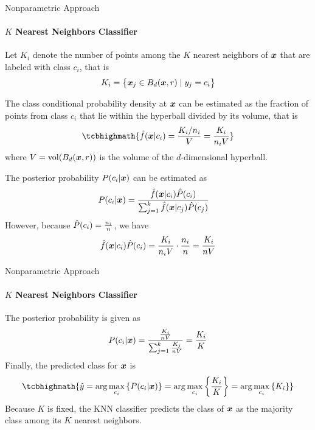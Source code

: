\begin{frame}{Nonparametric Approach}
\framesubtitle{$K$ Nearest Neighbors Classif\/{i}er}
Let $K_i$ denote the number of points among the $K$ nearest neighbors of
${\boldsymbol x}$ that are labeled with class $c_i$, that is
\begin{align*}
  K_i = \bigl\{{\boldsymbol x}_{j} \in B_d({\boldsymbol x},r) \mid y_{j} = c_i\bigr\}
\end{align*}

The class conditional probability density at ${\boldsymbol x}$ can be estimated as
the fraction of points from class $c_i$ that lie within the hyperball
divided by its volume, that is
\begin{align*}
\tcbhighmath{
  \hf(\bx|c_i) = \frac{K_i\text{/}n_i}{V}  = \frac{K_i}{n_i V}
}
\end{align*}
where $V = \vol(B_d(\bx,r))$ is the volume of the $d$-dimensional
hyperball.

The posterior probability $P(c_i|{\boldsymbol x})$
can be estimated as
\begin{align*}
    P(c_i|{\boldsymbol x}) &
    = \frac{\kern3pt\hat{\kern-3pt f}({\boldsymbol x}|c_i) \hat{P}(c_i)}{\sum_{j=1}^k \kern3pt\hat{\kern-3pt f}({\boldsymbol x}|c_{j}) \hat{P}(c_{j})}
\end{align*}
However, because $\hat{P}(c_i) = \tfrac{n_i}{n}$, we have
\begin{align*}
  \kern3pt\hat{\kern-3pt f}({\boldsymbol x}|c_i) \hat{P}(c_i) = \frac{K_i}{n_i V} \cdot \frac{n_i}{n} =
  \frac{K_i}{nV}
\end{align*}
\end{frame}


\begin{frame}{Nonparametric Approach}
\framesubtitle{$K$ Nearest Neighbors Classif\/{i}er}
The posterior probability is given as
\begin{align*}
  P(c_i|{\boldsymbol x}) =
  \frac{\frac{K_i}{n V}}{\sum_{j=1}^k \frac{K_{j}}{n V}}
  = \frac{K_i}{K}
\end{align*}
F{i}nally, the predicted class for ${\boldsymbol x}$ is
\begin{align*}
\tcbhighmath{
  \hy = \arg\max_{c_i} \lB\{ P(c_i | \bx) \rB\} =
  \arg\max_{c_i} \lB\{ \frac{K_i}{K} \rB\} =
  \arg\max_{c_i}  \lB\{ K_i \rB\}
}
\end{align*}
Because $K$ is f\/{i}xed, the KNN classif\/{i}er predicts the class of ${\boldsymbol x}$ as
the majority class among its $K$ nearest neighbors.
\end{frame}

